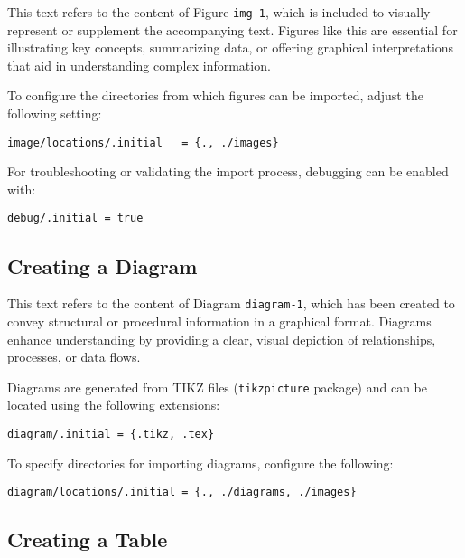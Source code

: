 
This text refers to the content of Figure \texttt{img-1}, which is included to visually represent or supplement the accompanying text. Figures like this are essential for illustrating key concepts, summarizing data, or offering graphical interpretations that aid in understanding complex information.

To configure the directories from which figures can be imported, adjust the following setting:

\begin{verbatim}
image/locations/.initial   = {., ./images}
\end{verbatim}

For troubleshooting or validating the import process, debugging can be enabled with:

\begin{verbatim}
debug/.initial = true
\end{verbatim}


\subsection*{Creating a Diagram}


This text refers to the content of Diagram \texttt{diagram-1}, which has been created to convey structural or procedural information in a graphical format. Diagrams enhance understanding by providing a clear, visual depiction of relationships, processes, or data flows.

Diagrams are generated from TIKZ files (\texttt{tikzpicture} package) and can be located using the following extensions:

\begin{verbatim}
diagram/.initial = {.tikz, .tex}
\end{verbatim}

To specify directories for importing diagrams, configure the following:

\begin{verbatim}
diagram/locations/.initial = {., ./diagrams, ./images}
\end{verbatim}


\subsection*{Creating a Table}


